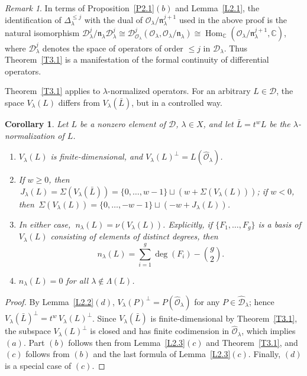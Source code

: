 \documentclass[11pt,reqno]{amsart}
\theoremstyle{plain}
\newtheorem{corollary}{Corollary}[section]
\theoremstyle{definition}
\theoremstyle{remark}
\newtheorem*{remark}{Remark}
\numberwithin{equation}{section}
\newcommand{\cD}{\mathcal{D}}
\newcommand{\cO}{\mathcal{O}}
\newcommand{\C}{\mathbb{C}}
\newcommand{\nl}{\mathfrak{n}_\lambda}
\newcommand{\hO}{\widehat{\cO}}
\newcommand{\hD}{\widehat{\cD}}
\newcommand{\Dl}{\Delta_\lambda}
\DeclareMathOperator{\Hom}{Hom}
\begin{document}
\begin{remark}
In terms of Proposition~\ref{P2.1}$(b)$ and Lemma~\ref{L2.1}, the identification of $\Dl^{\le j}$
with the dual of $\cO_\lambda/\nl^{j+1}$ used in the above proof is the natural isomorphism
$\cD^j_\lambda/\nl \cD^j_\lambda \cong \cD^j_{\cO_\lambda}(\cO_\lambda, \cO_\lambda/\nl) \cong
\Hom_{\C}(\cO_\lambda/\nl^{j+1}, \C)$, where $\cD^j_\lambda$ denotes the space of operators of
order $\le j$ in $\cD_\lambda$. Thus Theorem~\ref{T3.1} is a manifestation of the formal
continuity of differential operators.
\end{remark}

Theorem~\ref{T3.1} applies to $\lambda$-normalized operators. For an arbitrary $L \in \cD$, the
space $V_\lambda(L)$ differs from $V_\lambda(\bar L)$, but in a controlled way.

\begin{corollary}
\label{C3.1}
Let $L$ be a nonzero element of $\cD$, $\lambda \in X$, and let $\bar L = t^w L$ be the
$\lambda$-normalization of $L$.
\begin{enumerate}
\item[$(a)$] $V_\lambda(L)$ is finite-dimensional, and $V_\lambda(L)^\perp = L(\hO_\lambda)$.
\item[$(b)$] If $w \ge 0$, then $\,J_\lambda(L) = \Sigma(V_\lambda(\bar L)) = \{0, \ldots, w-1\}
\sqcup (w + \Sigma(V_\lambda(L)))$; if $w < 0$, then $\,\Sigma(V_\lambda(L)) = \{0, \ldots, -w-1\}
\sqcup (-w + J_\lambda(L))$.
\item[$(c)$] In either case, $\ n_\lambda(L) = \nu(V_\lambda(L))$. Explicitly, if
$\{F_1, \ldots, F_g\}$ is a basis of $V_\lambda(L)$ consisting of elements of distinct degrees,
then
\begin{equation}
\label{E37}
  n_\lambda(L) = \sum_{i=1}^g \deg(F_i) - \binom{g}{2} .
\end{equation}
\item[$(d)$] $n_\lambda(L) = 0$ for all $\lambda \notin \Lambda(L)$.
\end{enumerate}
\end{corollary}

\begin{proof}
By Lemma~\ref{L2.2}$(d)$, $V_\lambda(P)^\perp = P(\hO_\lambda)$ for any $P \in \hD_\lambda$; hence
$V_\lambda(\bar L)^\perp = t^w\, V_\lambda(L)^\perp$. Since $V_\lambda(\bar L)$ is
finite-dimensional by Theorem~\ref{T3.1}, the subspace $V_\lambda(L)^\perp$ is closed and has
finite codimension in $\hO_\lambda$, which implies $(a)$. Part $(b)$ follows then from
Lemma~\ref{L2.3}$(c)$ and Theorem~\ref{T3.1}, and $(c)$ follows from $(b)$ and the last formula of
Lemma~\ref{L2.3}$(c)$. Finally, $(d)$ is a special case of $(c)$.
\end{proof}
\end{document}
